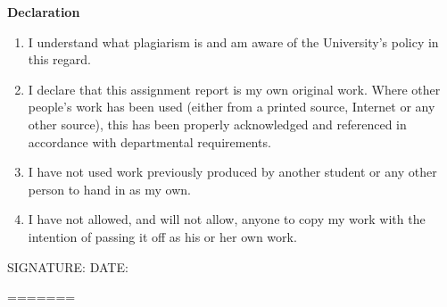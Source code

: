 {\textbf{Declaration}
\begin{enumerate}
\item I understand what plagiarism is and am aware of the University's
  policy in this regard.
\item I declare that this assignment report is my own original work.
  Where other people's work has been used (either from a printed source,
  Internet or any other source), this has been properly acknowledged and
  referenced in accordance with departmental requirements.
\item I have not used work previously produced by another student or any
  other person to hand in as my own.
\item I have not allowed, and will not allow, anyone to copy my work with
  the intention of passing it off as his or her own work.
\end{enumerate}

\vspace*{1cm}

SIGNATURE: \makebox[3in]{\hrulefill} \quad DATE: \makebox[1.5in]{\hrulefill}
}

\newpage


=======

\newpage

